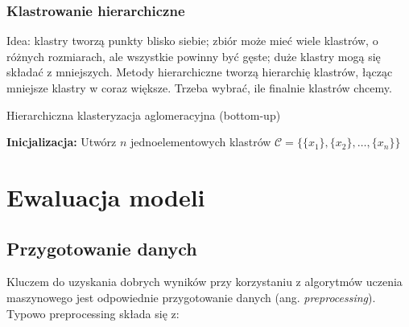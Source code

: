\documentclass{myclass}
\begin{document}
\subsubsection{Klastrowanie hierarchiczne}

Idea: klastry tworzą punkty blisko siebie; zbiór może mieć wiele klastrów, o różnych rozmiarach, ale
wszystkie powinny być gęste; duże klastry mogą się składać z mniejszych. Metody hierarchiczne tworzą
hierarchię klastrów, łącząc mniejsze klastry w coraz większe. Trzeba wybrać, ile finalnie klastrów
chcemy.

\begin{algorithm}[ht]
\caption{Hierarchiczna klasteryzacja aglomeracyjna (bottom-up)}

\BlankLine
\textbf{Inicjalizacja:} Utwórz $n$ jednoelementowych klastrów $\mathcal{C} = \{\{x_1\}, \{x_2\}, \ldots, \{x_n\}\}$\;


\end{algorithm}



\section{Ewaluacja modeli}

\subsection{Przygotowanie danych}

Kluczem do uzyskania dobrych wyników przy korzystaniu z algorytmów uczenia maszynowego jest
odpowiednie przygotowanie danych (ang. \emph{preprocessing}). Typowo preprocessing składa się z:
\end{document}

